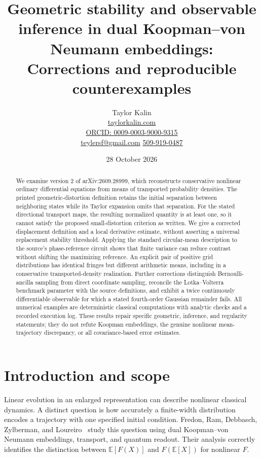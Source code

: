 \documentclass[11pt]{article}
\title{Geometric stability and observable inference in dual Koopman--von Neumann embeddings:\\Corrections and reproducible counterexamples}
\author{Taylor Kalin\\
\small\href{https://taylorkalin.com}{taylorkalin.com}\\
\small\href{https://orcid.org/0009-0003-9000-9315}{ORCID: 0009-0003-9000-9315}\\
\small\href{mailto:teylersf@gmail.com}{teylersf@gmail.com}\quad
\href{tel:+15099190487}{509-919-0487}}
\date{28 October 2026}
\theoremstyle{definition}
\theoremstyle{remark}
\newcommand{\E}[1]{\mathbb E\!\left[#1\right]}
\begin{document}
\maketitle
\begin{abstract}
We examine version 2 of arXiv:2609.28999, which reconstructs conservative
nonlinear ordinary differential equations from means of transported
probability densities. The printed geometric-distortion definition retains
the initial separation between neighboring states while its Taylor expansion
omits that separation. For the stated directional transport maps, the resulting
normalized quantity is at least one, so it cannot satisfy the proposed
small-distortion criterion as written. We give a corrected displacement
definition and a local derivative estimate, without asserting a universal
replacement stability threshold. Applying the standard circular-mean
description to the source's phase-reference circuit shows that finite variance
can reduce contrast without shifting the maximizing reference. An explicit
pair of positive grid distributions has identical fringes but different
arithmetic means, including in a conservative transported-density realization.
Further corrections distinguish Bernoulli-ancilla sampling from direct
coordinate sampling, reconcile the Lotka--Volterra benchmark parameter with
the source definitions, and exhibit a twice continuously differentiable
observable for which a stated fourth-order Gaussian remainder fails.
All numerical examples are deterministic classical computations with analytic
checks and a recorded execution log. These results repair specific geometric,
inference, and regularity statements; they do not refute Koopman embeddings,
the genuine nonlinear mean-trajectory discrepancy, or all covariance-based
error estimates.
\end{abstract}

\section{Introduction and scope}
\label{sec:introduction}
Linear evolution in an enlarged representation can describe nonlinear
classical dynamics. A distinct question is how accurately a finite-width
distribution encodes a trajectory with one specified initial condition.
Fredon, Ram, Debbasch, Zylberman, and Loureiro~\cite{original} study this
question using dual Koopman--von Neumann embeddings, transport, and quantum
readout. Their analysis correctly identifies the distinction between
$\E{F(X)}$ and $F(\E{X})$ for nonlinear $F$.
\end{document}
